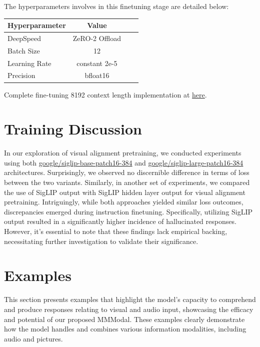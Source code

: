 \documentclass[preprint]{article}
\begin{document}
The hyperparameters involves in this finetuning stage are detailed below:

\begin{table}[h]
  \centering
  \begin{tabular}{lccl}
    \hline
    \textbf{Hyperparameter} & \textbf{Value} \\
    \hline
    DeepSpeed               & ZeRO-2 Offload \\
    Batch Size              & 12             \\
    Learning Rate           & constant 2e-5  \\
    Precision               & bfloat16       \\
    \hline
  \end{tabular}
\end{table}

Complete fine-tuning 8192 context length implementation at \href{https://github.com/mesolitica/multimodal-LLM/blob/master/run-deepspeed.sh}{here}.

\section{Training Discussion}

In our exploration of visual alignment pretraining, we conducted experiments using both \href{https://huggingface.co/google/siglip-base-patch16-384}{google/siglip-base-patch16-384} and \href{https://huggingface.co/google/siglip-large-patch16-384}{google/siglip-large-patch16-384} architectures. Surprisingly, we observed no discernible difference in terms of loss between the two variants. Similarly, in another set of experiments, we compared the use of SigLIP \cite{zhai2023sigmoid} output with SigLIP \cite{zhai2023sigmoid} hidden layer output for visual alignment pretraining. Intriguingly, while both approaches yielded similar loss outcomes, discrepancies emerged during instruction finetuning. Specifically, utilizing SigLIP \cite{zhai2023sigmoid} output resulted in a significantly higher incidence of hallucinated responses. However, it's essential to note that these findings lack empirical backing, necessitating further investigation to validate their significance.

\section{Examples}

This section presents examples that highlight the model's capacity to comprehend and produce responses relating to visual and audio input, showcasing the efficacy and potential of our proposed MMModal. These examples clearly demonstrate how the model handles and combines various information modalities, including audio and pictures.
\end{document}
